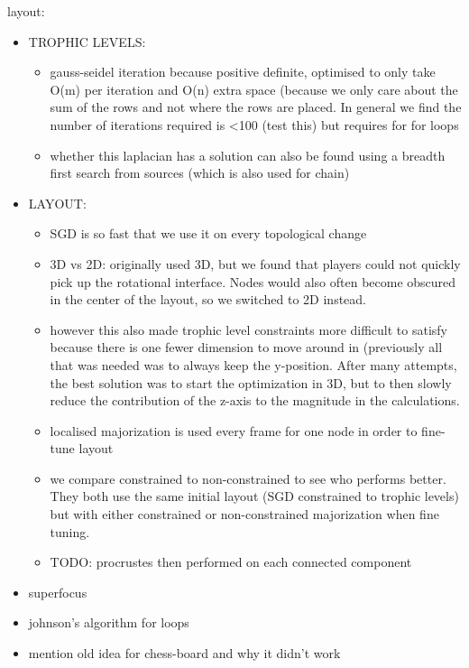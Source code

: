 layout:
\begin{itemize}
    \item TROPHIC LEVELS:
    \begin{itemize}
        \item gauss-seidel iteration because positive definite, optimised to only take O(m) per iteration and O(n) extra space (because we only care about the sum of the rows and not where the rows are placed. In general we find the number of iterations required is <100 (test this) but requires for for loops
        \item whether this laplacian has a solution can also be found using a breadth first search from sources (which is also used for chain)
    \end{itemize}
    \item LAYOUT:
    \begin{itemize}
        \item SGD is so fast that we use it on every topological change
        \item 3D vs 2D: originally used 3D, but we found that players could not quickly pick up the rotational interface. Nodes would also often become obscured in the center of the layout, so we switched to 2D instead. 
        \item however this also made trophic level constraints more difficult to satisfy because there is one fewer dimension to move around in (previously all that was needed was to always keep the y-position. After many attempts, the best solution was to start the optimization in 3D, but to then slowly reduce the contribution of the z-axis to the magnitude in the calculations.
        \item localised majorization is used every frame for one node in order to fine-tune layout
        \item we compare constrained to non-constrained to see who performs better. They both use the same initial layout (SGD constrained to trophic levels) but with either constrained or non-constrained majorization when fine tuning.
        \item TODO: procrustes then performed on each connected component
    \end{itemize}
    
    \item superfocus
    \item johnson's algorithm for loops
    \item mention old idea for chess-board and why it didn't work
\end{itemize}

